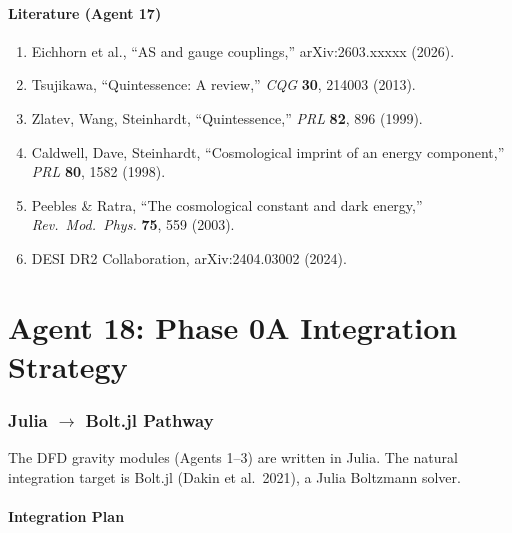 \documentclass[11pt,a4paper]{article}
\begin{document}
\subsection{Literature (Agent 17)}

\begin{enumerate}
\item Eichhorn et al., ``AS and gauge couplings,'' arXiv:2603.xxxxx (2026).
\item Tsujikawa, ``Quintessence: A review,'' \textit{CQG} \textbf{30}, 214003 (2013).
\item Zlatev, Wang, Steinhardt, ``Quintessence,'' \textit{PRL} \textbf{82}, 896 (1999).
\item Caldwell, Dave, Steinhardt, ``Cosmological imprint of an energy component,'' \textit{PRL} \textbf{80}, 1582 (1998).
\item Peebles \& Ratra, ``The cosmological constant and dark energy,'' \textit{Rev.\ Mod.\ Phys.} \textbf{75}, 559 (2003).
\item DESI DR2 Collaboration, arXiv:2404.03002 (2024).
\end{enumerate}


\part{Agent 18: Phase 0A Integration Strategy}
\label{part:integration}

\section{Julia $\to$ Bolt.jl Pathway}

The DFD gravity modules (Agents 1--3) are written in Julia. The natural integration target is Bolt.jl (Dakin et al.\ 2021), a Julia Boltzmann solver.

\subsection{Integration Plan}
\end{document}
